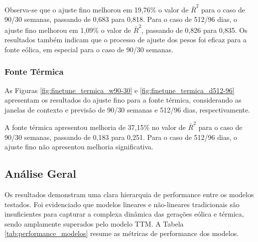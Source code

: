 Observa-se que o ajuste fino melhorou em 19,76\% o valor de $\bar{R}^2$ para o caso de 90/30 semanas, passando de 0,683 para 0,818.
Para o caso de 512/96 dias, o ajuste fino melhorou em 1,09\% o valor de $\bar{R}^2$, passando de 0,826 para 0,835. Os resultados
também indicam que o processo de ajuste dos pesos foi eficaz para a fonte eólica, em especial para o caso de 90/30 semanas.

\subsubsection{Fonte Térmica}
\begin{figure}[!ht]
  {}
  {}
\end{figure}
\begin{figure}[!ht]
  {}
  {}
\end{figure}
As Figuras \ref{fig:finetune_termica_w90-30} e \ref{fig:finetune_termica_d512-96} apresentam os resultados do ajuste fino
para a fonte térmica, considerando as janelas de contexto e previsão de 90/30 semanas e 512/96 dias, respectivamente.

A fonte térmica apresentou melhoria de 37,15\% no valor de $\bar{R}^2$ para o caso de 90/30 semanas, passando de 0,183 para 0,251.
Para o caso de 512/96 dias, o ajuste fino não apresentou melhoria significativa. 

\subsection{Análise Geral}
Os resultados demonstram uma clara hierarquia de performance entre os modelos testados. Foi evidenciado que modelos 
lineares e não-lineares tradicionais são insuficientes para capturar a complexa dinâmica das gerações eólica e térmica, sendo 
amplamente superados pelo modelo TTM. A Tabela \ref{tab:performance_modelos} resume as métricas de performance dos modelos.

